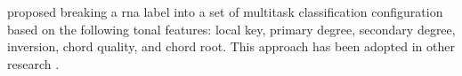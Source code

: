 
\textcite{chen2018functional} proposed breaking a \gls{rna}
label into a set of multitask classification configuration
based on the following tonal features: local key, primary
degree, secondary degree, inversion, chord quality, and
chord root. This approach has been adopted in other research
\parencite{chen2019harmony, micchi2020not,micchi2021deep}.
